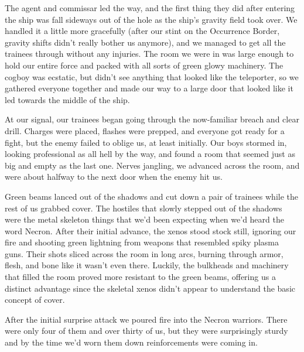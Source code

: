 The agent and commissar led the way, and the first thing they did after entering the ship was fall sideways out of the hole as the ship’s gravity field took over. 
We handled it a little more gracefully (after our stint on the Occurrence Border, gravity shifts didn’t really bother us anymore), and we managed to get all the trainees through without any injuries. 
The room we were in was large enough to hold our entire force and packed with all sorts of green glowy machinery. 
The cogboy was ecstatic, but didn’t see anything that looked like the teleporter, so we gathered everyone together and made our way to a large door that looked like it led towards the middle of the ship.

At our signal, our trainees began going through the now-familiar breach and clear drill. 
Charges were placed, flashes were prepped, and everyone got ready for a fight, but the enemy failed to oblige us, at least initially. 
Our boys stormed in, looking professional as all hell by the way, and found a room that seemed just as big and empty as the last one. 
Nerves jangling, we advanced across the room, and were about halfway to the next door when the enemy hit us.

Green beams lanced out of the shadows and cut down a pair of trainees while the rest of us grabbed cover. 
The hostiles that slowly stepped out of the shadows were the metal skeleton things that we’d been expecting when we’d heard the word Necron. 
After their initial advance, the xenos stood stock still, ignoring our fire and shooting green lightning from weapons that resembled spiky plasma guns. 
Their shots sliced across the room in long arcs, burning through  armor, flesh, and bone like it wasn’t even there. 
Luckily, the bulkheads and machinery that filled the room proved more resistant to the green beams, offering us a distinct advantage since the skeletal xenos didn’t appear to understand the basic concept of cover.

After the initial surprise attack we poured fire into the Necron warriors. 
There were only four of them and over thirty of us, but they were surprisingly sturdy and by the time we’d worn them down reinforcements were coming in.


